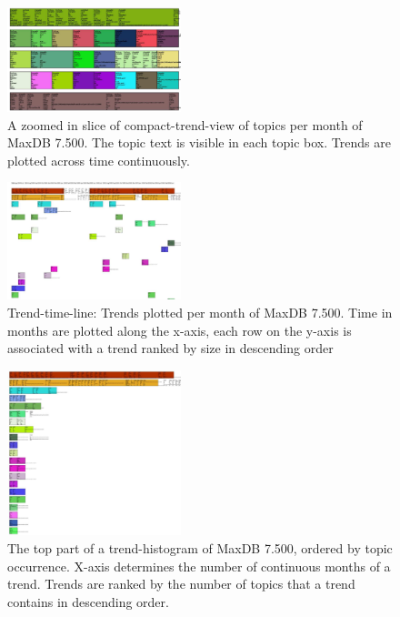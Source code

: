 \documentclass[times, 10pt,twocolumn]{article}
\begin{document}
\begin{figure}[t]
  \centering
  \includegraphics[width=0.45\textwidth]{fixed-time-smear-plot-cropped}
  \caption{A zoomed in slice of compact-trend-view of topics per month of MaxDB 7.500. The topic text is visible in each topic box. Trends are plotted across time continuously.}
  \label{fig:zoomedsmear}
\end{figure}


\begin{figure}
  \centering
  \includegraphics[width=0.45\textwidth]{class-smear-plot-crop-scaled}
  \caption{Trend-time-line: Trends plotted per month of MaxDB 7.500. Time in months are plotted along the x-axis, each row on the y-axis is associated with a trend ranked by size in descending order}         
  \label{fig:trendtimeline}
\end{figure}


\begin{figure}
  \centering
  \includegraphics[width=0.45\textwidth]{histogram-cropped-scaled}
  \caption{The top part of a trend-histogram of MaxDB 7.500, ordered
    by topic occurrence. X-axis determines the number of continuous
    months of a trend. Trends are ranked by the number of topics that
    a trend contains in descending order.}
  \label{fig:histogram}
\end{figure}
\end{document}
